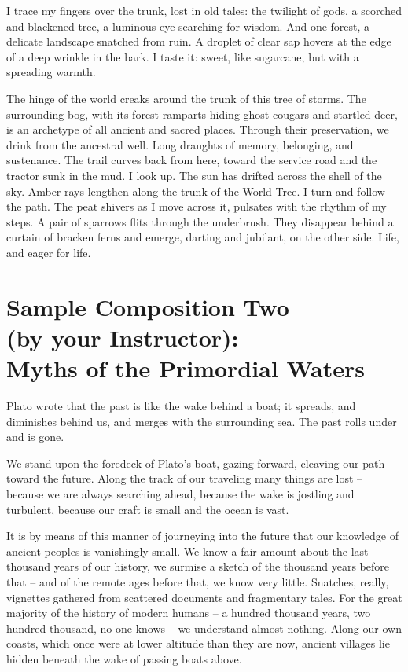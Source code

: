 \documentclass[10pt,DIV09,letterpaper,oneside,headsepline]{scrreprt}
\begin{document}
I trace my fingers over the trunk, lost in old tales: the twilight of
gods, a scorched and blackened tree, a luminous eye searching for
wisdom. And one forest, a delicate landscape snatched from ruin. A
droplet of clear sap hovers at the edge of a deep wrinkle in the bark.
I taste it: sweet, like sugarcane, but with a spreading warmth. 

The hinge of the world creaks around the trunk of this tree of storms.
The surrounding bog, with its forest ramparts hiding ghost cougars and
startled deer, is an archetype of all ancient and sacred places.
Through their preservation, we drink from the ancestral well. Long
draughts of memory, belonging, and sustenance. The trail curves back
from here, toward the service road and the tractor sunk in the mud. I
look up. The sun has drifted across the shell of the sky. Amber rays
lengthen along the trunk of the World Tree. I turn and follow the
path. The peat shivers as I move across it, pulsates with the rhythm
of my steps. A pair of sparrows flits through the underbrush. They
disappear behind a curtain of bracken ferns and emerge, darting and
jubilant, on the other side. Life, and eager for life.

\newpage
\section{Sample Composition Two\\ (by your Instructor):\\Myths of the Primordial Waters}

Plato wrote that the past is like the wake behind a boat; it spreads,
and diminishes behind us, and merges with the surrounding sea. The
past rolls under and is gone.

We stand upon the foredeck of Plato's boat, gazing forward, cleaving
our path toward the future. Along the track of our traveling many
things are lost -- because we are always searching ahead, because the
wake is jostling and turbulent, because our craft is small and the
ocean is vast.

It is by means of this manner of journeying into the future that our
knowledge of ancient peoples is vanishingly small. We know a fair
amount about the last thousand years of our history, we surmise a
sketch of the thousand years before that -- and of the remote ages
before that, we know very little. Snatches, really, vignettes gathered
from scattered documents and fragmentary tales. For the great majority
of the history of modern humans -- a hundred thousand years, two
hundred thousand, no one knows -- we understand almost nothing. Along
our own coasts, which once were at lower altitude than they are now,
ancient villages lie hidden beneath the wake of passing boats above.
\end{document}
